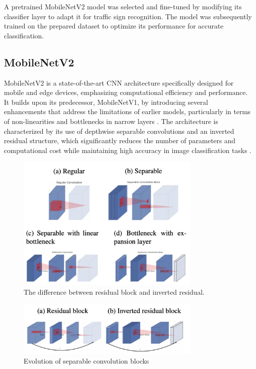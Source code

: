 A pretrained MobileNetV2 model was selected and fine-tuned by modifying its classifier layer to adapt it for traffic sign recognition. The model was subsequently trained on the prepared dataset to optimize its performance for accurate classification.

\subsection{MobileNetV2}

MobileNetV2 is a state-of-the-art CNN architecture specifically designed for mobile and edge devices, emphasizing computational efficiency and performance. It builds upon its predecessor, MobileNetV1, by introducing several enhancements that address the limitations of earlier models, particularly in terms of non-linearities and bottlenecks in narrow layers \cite{10.1371/journal.pone.0283121,10.1109/cvpr.2018.00474}. The architecture is characterized by its use of depthwise separable convolutions and an inverted residual structure, which significantly reduces the number of parameters and computational cost while maintaining high accuracy in image classification tasks \cite{10.21203/rs.3.rs-4523549/v1,10.1109/cvpr.2018.00474}.

\begin{figure}[H]
    \centering
    \includegraphics[width=0.8\textwidth]{images/figure7.png}
    \caption{The difference between residual block and inverted residual.}
    \label{fig:fig7}
  \end{figure}


\begin{figure}[H]
    \centering
    \includegraphics[width=0.8\textwidth]{images/figure8.png}
    \caption{Evolution of separable convolution blocks}
    \label{fig:fig8}
  \end{figure}
  
